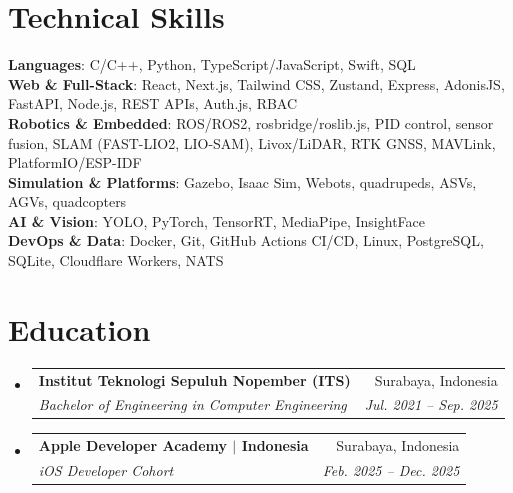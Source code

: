 \documentclass[a4paper,11pt]{article}
\makeatletter
\newcommand{\resumeSubheading}[4]{
  \vspace{-2pt}\item
    \begin{tabular*}{0.97\textwidth}[t]{l@{\extracolsep{\fill}}r}
      \textbf{#1} & #2 \\
      \textit{\small#3} & \textit{\small #4} \\
    \end{tabular*}\vspace{-7pt}
}
\newcommand{\resumeSubHeadingListStart}{\begin{itemize}[leftmargin=0.15in, label={}]}
\newcommand{\resumeSubHeadingListEnd}{\end{itemize}}
\makeatother
\begin{document}
\section{Technical Skills}
 \begin{itemize}[leftmargin=0.15in, label={}]
    \small{\item{
     \textbf{Languages}{: C/C++, Python, TypeScript/JavaScript, Swift, SQL} \\
     \textbf{Web \& Full-Stack}{: React, Next.js, Tailwind CSS, Zustand, Express, AdonisJS, FastAPI, Node.js, REST APIs, Auth.js, RBAC} \\
     \textbf{Robotics \& Embedded}{: ROS/ROS2, rosbridge/roslib.js, PID control, sensor fusion, SLAM (FAST-LIO2, LIO-SAM), Livox/LiDAR, RTK GNSS, MAVLink, PlatformIO/ESP-IDF} \\
     \textbf{Simulation \& Platforms}{: Gazebo, Isaac Sim, Webots, quadrupeds, ASVs, AGVs, quadcopters} \\
     \textbf{AI \& Vision}{: YOLO, PyTorch, TensorRT, MediaPipe, InsightFace} \\
     \textbf{DevOps \& Data}{: Docker, Git, GitHub Actions CI/CD, Linux, PostgreSQL, SQLite, Cloudflare Workers, NATS} \\
    }}
 \end{itemize}

\section{Education}
  \resumeSubHeadingListStart
    \resumeSubheading
      {Institut Teknologi Sepuluh Nopember (ITS)}{Surabaya, Indonesia}
      {Bachelor of Engineering in Computer Engineering}{Jul. 2021 -- Sep. 2025}
    \resumeSubheading
      {Apple Developer Academy $|$ Indonesia}{Surabaya, Indonesia}
      {iOS Developer Cohort}{Feb. 2025 -- Dec. 2025}
  \resumeSubHeadingListEnd
\end{document}
